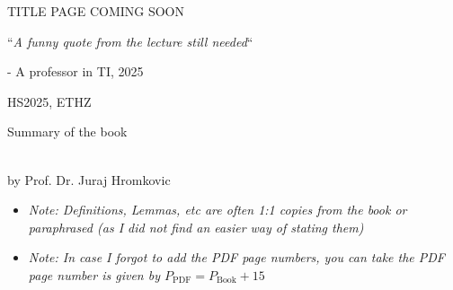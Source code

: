 \documentclass{article}
\begin{document}
\startDocument
\usetcolorboxes

\vspace{2cm}
\begin{Huge}
    \begin{center}
        TITLE PAGE COMING SOON
    \end{center}
\end{Huge}


\vspace{4cm}
\begin{center}
    \begin{Large}
        ``\textit{A funny quote from the lecture still needed}``
    \end{Large}

    \hspace{3cm} - A professor in TI, 2025
\end{center}

\vspace{3cm}
\begin{center}
    HS2025, ETHZ\\[0.2cm]
    \begin{Large}
        Summary of the book \color{MidnightBlue}\color{black}
    \end{Large}\\[0.2cm]
    by Prof. Dr. Juraj Hromkovic
\end{center}

\newpage


\begin{scriptsize}
    \begin{itemize}
        \item \textit{Note: Definitions, Lemmas, etc are often 1:1 copies from the book or paraphrased (as I did not find an easier way of stating them)}
        \item \textit{Note: In case I forgot to add the PDF page numbers, you can take the PDF page number is given by $P_{\text{PDF}} = P_{\text{Book}} + 15$}
    \end{itemize}
\end{scriptsize}

\newpage





\newsection
\end{document}
